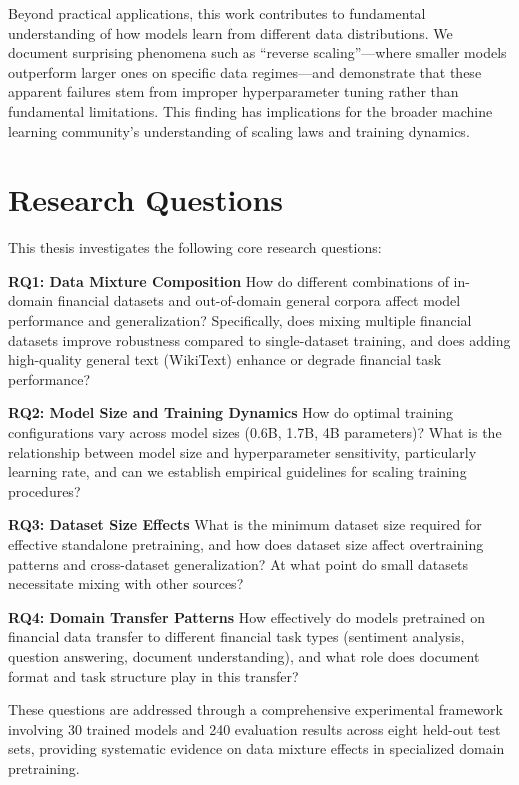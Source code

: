 Beyond practical applications, this work contributes to fundamental understanding of how models learn from different data distributions. We document surprising phenomena such as ``reverse scaling''—where smaller models outperform larger ones on specific data regimes—and demonstrate that these apparent failures stem from improper hyperparameter tuning rather than fundamental limitations. This finding has implications for the broader machine learning community's understanding of scaling laws and training dynamics.

\section{Research Questions}

This thesis investigates the following core research questions:

\textbf{RQ1: Data Mixture Composition}
How do different combinations of in-domain financial datasets and out-of-domain general corpora affect model performance and generalization? Specifically, does mixing multiple financial datasets improve robustness compared to single-dataset training, and does adding high-quality general text (WikiText) enhance or degrade financial task performance?

\textbf{RQ2: Model Size and Training Dynamics}
How do optimal training configurations vary across model sizes (0.6B, 1.7B, 4B parameters)? What is the relationship between model size and hyperparameter sensitivity, particularly learning rate, and can we establish empirical guidelines for scaling training procedures?

\textbf{RQ3: Dataset Size Effects}
What is the minimum dataset size required for effective standalone pretraining, and how does dataset size affect overtraining patterns and cross-dataset generalization? At what point do small datasets necessitate mixing with other sources?

\textbf{RQ4: Domain Transfer Patterns}
How effectively do models pretrained on financial data transfer to different financial task types (sentiment analysis, question answering, document understanding), and what role does document format and task structure play in this transfer?

These questions are addressed through a comprehensive experimental framework involving 30 trained models and 240 evaluation results across eight held-out test sets, providing systematic evidence on data mixture effects in specialized domain pretraining.

